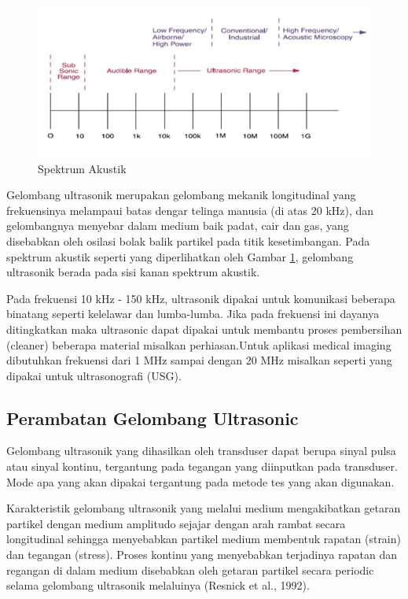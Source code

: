 \begin{figure}[h!]
	\centering
	\includegraphics[width=0.7\linewidth]{"gambar/spektrum akustik"}
	\caption{Spektrum Akustik}
	\label{fig:spektrum-akustik}
\end{figure}

Gelombang ultrasonik merupakan gelombang mekanik longitudinal yang frekuensinya melampaui batas dengar telinga manusia (di atas 20 kHz), dan 
gelombangnya menyebar dalam medium baik padat, cair dan gas, yang disebabkan oleh osilasi bolak balik partikel pada titik kesetimbangan. 
Pada spektrum akustik seperti yang diperlihatkan oleh Gambar \ref{fig:spektrum-akustik}, gelombang ultrasonik berada pada sisi kanan spektrum akustik.

Pada frekuensi 10 kHz - 150 kHz, ultrasonik dipakai untuk komunikasi beberapa binatang seperti kelelawar dan lumba-lumba. Jika pada frekuensi ini 
dayanya ditingkatkan maka ultrasonic dapat dipakai untuk membantu proses pembersihan (cleaner) beberapa material misalkan perhiasan.Untuk aplikasi 
medical imaging dibutuhkan frekuensi dari 1 MHz sampai dengan 20 MHz misalkan seperti yang dipakai untuk ultrasonografi (USG).

\subsection{Perambatan Gelombang Ultrasonic}

Gelombang ultrasonik yang dihasilkan oleh transduser dapat berupa sinyal pulsa atau sinyal kontinu, tergantung pada tegangan yang diinputkan pada 
transduser. Mode apa yang akan dipakai tergantung pada metode tes yang akan digunakan. 

Karakteristik gelombang ultrasonik yang melalui medium mengakibatkan getaran partikel dengan medium amplitudo sejajar dengan arah rambat secara 
longitudinal sehingga menyebabkan partikel medium membentuk rapatan (strain) dan tegangan (stress). Proses kontinu yang menyebabkan terjadinya rapatan 
dan regangan di dalam medium disebabkan oleh getaran partikel secara periodic selama gelombang ultrasonik melaluinya (Resnick et al., 1992).

